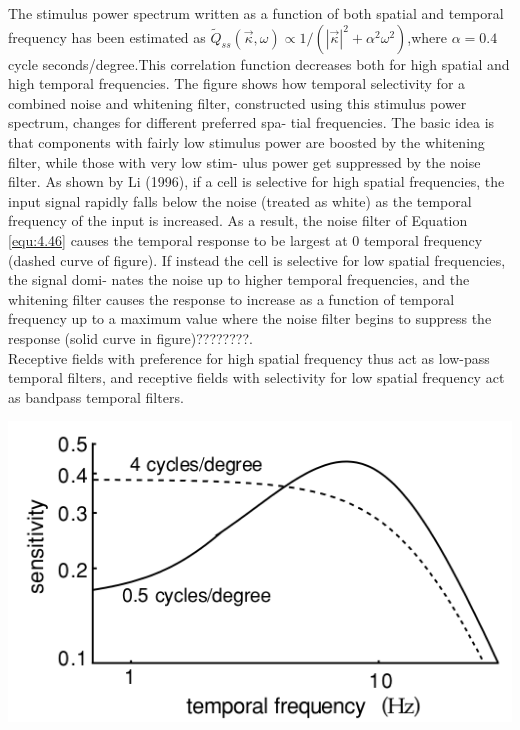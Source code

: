 \begin{exm}
 The stimulus power spectrum written as a function of both spatial and
temporal frequency has been estimated as
$\tilde{Q}_{ss}(\vec{\kappa},\omega)\propto 1/(\left| \vec{\kappa} \right|^{2}+\alpha^{2}\omega^{2})$,where $\alpha=0.4$ cycle seconds/degree.This correlation function decreases
both for high spatial and high temporal frequencies. The figure shows how
temporal selectivity for a combined noise and whitening filter, constructed
using this stimulus power spectrum, changes for different preferred spa-
tial frequencies. The basic idea is that components with fairly low stimulus
power are boosted by the whitening filter, while those with very low stim-
ulus power get suppressed by the noise filter. As shown by Li (1996), if a
cell is selective for high spatial frequencies, the input signal rapidly falls
below the noise (treated as white) as the temporal frequency of the input is
increased. As a result, the noise filter of Equation \ref{equ:4.46} causes the temporal
response to be largest at 0 temporal frequency (dashed curve of figure).
If instead the cell is selective for low spatial frequencies, the signal domi-
nates the noise up to higher temporal frequencies, and the whitening filter
causes the response to increase as a function of temporal frequency up to
a maximum value where the noise filter begins to suppress the response
(solid curve in figure)????????.\\

Receptive fields with preference for high spatial
frequency thus act as low-pass temporal filters, and receptive fields with
selectivity for low spatial frequency act as bandpass temporal filters.
\begin{center}
    \label{fig:4-6}
  \includegraphics[scale = 0.4]{./png/4-6}
\end{center}
\end{exm}


